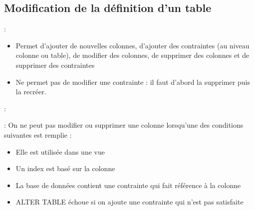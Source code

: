 \documentclass[10pt]{beamer}
\begin{document}
\subsection{Modification de la définition d'un table}
\begin{frame}{\secname : \subsecname}
    \begin{itemize}
        \item Permet d'ajouter de nouvelles colonnes, d'ajouter des contraintes (au niveau colonne ou table), de modifier des colonnes, de supprimer des colonnes et de supprimer des contraintes
        \item Ne permet pas de modifier une contrainte : il faut d'abord la supprimer puis la recréer.
    \end{itemize}
\end{frame}

\begin{frame}{\secname : \subsecname}
    
\end{frame}

\begin{frame}{\secname : \subsecname}
    On ne peut pas modifier ou supprimer une colonne lorsqu'une des conditions suivantes est remplie :
    \begin{itemize}
        \item Elle est utilisée dans une vue
        \item Un index est basé sur la colonne
        \item La base de données contient une contrainte qui fait référence à la colonne
        \item ALTER TABLE échoue si on ajoute une contrainte qui n'est pas satisfaite
    \end{itemize}
\end{frame}
\end{document}
